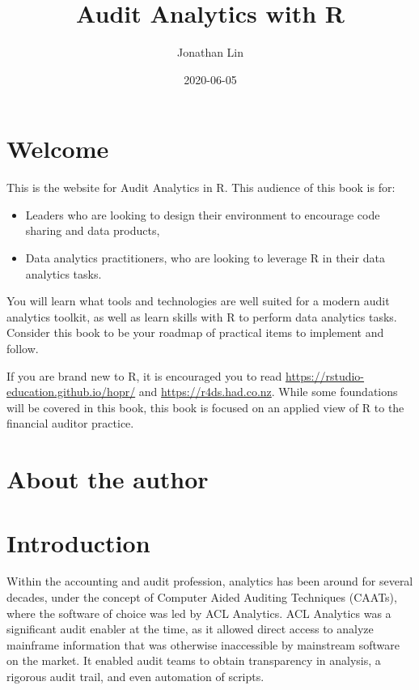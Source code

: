 \documentclass[
]{book}
\title{Audit Analytics with R}
\author{Jonathan Lin}
\date{2020-06-05}
\providecommand{\tightlist}{%
  \setlength{\itemsep}{0pt}\setlength{\parskip}{0pt}}
\begin{document}
\maketitle

{
\setcounter{tocdepth}{1}
\tableofcontents
}
\hypertarget{welcome}{%
\chapter*{Welcome}\label{welcome}}

This is the website for Audit Analytics in R. This audience of this book is for:

\begin{itemize}
\tightlist
\item
  Leaders who are looking to design their environment to encourage code sharing and data products,
\item
  Data analytics practitioners, who are looking to leverage R in their data analytics tasks.
\end{itemize}

You will learn what tools and technologies are well suited for a modern audit analytics toolkit, as well as learn skills with R to perform data analytics tasks. Consider this book to be your roadmap of practical items to implement and follow.

If you are brand new to R, it is encouraged you to read \url{https://rstudio-education.github.io/hopr/} and \url{https://r4ds.had.co.nz}. While some foundations will be covered in this book, this book is focused on an applied view of R to the financial auditor practice.

\hypertarget{about-the-author}{%
\chapter*{About the author}\label{about-the-author}}

\hypertarget{intro}{%
\chapter{Introduction}\label{intro}}

Within the accounting and audit profession, analytics has been around for several decades, under the concept of Computer Aided Auditing Techniques (CAATs), where the software of choice was led by ACL Analytics. ACL Analytics was a significant audit enabler at the time, as it allowed direct access to analyze mainframe information that was otherwise inaccessible by mainstream software on the market. It enabled audit teams to obtain transparency in analysis, a rigorous audit trail, and even automation of scripts.
\end{document}
